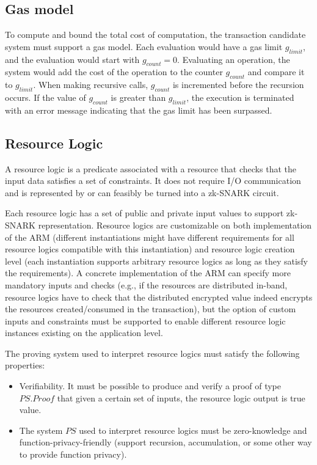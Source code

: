 \subsection{Gas model}
To compute and bound the total cost of computation, the transaction candidate system must support a gas model. Each evaluation would have a gas limit $g_{limit}$, and the evaluation would start with $g_{count} = 0$. Evaluating an operation, the system would add the cost of the operation to the counter $g_{count}$ and compare it to $g_{limit}$. When making recursive calls, $g_{count}$ is incremented before the recursion occurs. If the value of $g_{count}$ is greater than $g_{limit}$, the execution is terminated with an error message indicating that the gas limit has been surpassed.

\subsection{Resource Logic} %
A resource logic is a predicate associated with a resource that checks that the input data satisfies a set of constraints. It does not require I/O communication and is represented by or can feasibly be turned into a zk-SNARK circuit. 

Each resource logic has a set of public and private input values to support zk-SNARK representation. Resource logics are customizable on both implementation of the ARM (different instantiations might have different requirements for all resource logics compatible with this instantiation) and resource logic creation level (each instantiation supports arbitrary resource logics as long as they satisfy the requirements). A concrete implementation of the ARM can specify more mandatory inputs and checks (e.g., if the resources are distributed in-band, resource logics have to check that the distributed encrypted value indeed encrypts the resources created/consumed in the transaction), but the option of custom inputs and constraints must be supported to enable different resource logic instances existing on the application level.


The proving system used to interpret resource logics must satisfy the following properties:
\begin{itemize}
    \item Verifiability. It must be possible to produce and verify a proof of type $PS.Proof$ that given a certain set of inputs, the resource logic output is true value.
    \item The system $PS$ used to interpret resource logics must be zero-knowledge and function-privacy-friendly (support recursion, accumulation, or some other way to provide function privacy).
\end{itemize}

